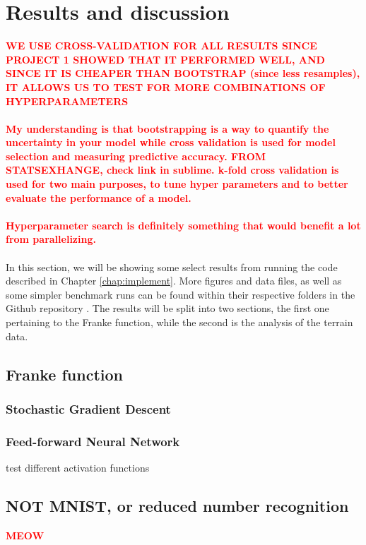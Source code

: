 \documentclass[a4paper]{article}
\newcommand\red[1]{\textcolor{red}{\textbf{#1}}}
\begin{document}
\section{Results and discussion} \label{chap:results}
\red{WE USE CROSS-VALIDATION FOR ALL RESULTS SINCE PROJECT 1 SHOWED THAT IT PERFORMED WELL, AND SINCE IT IS CHEAPER THAN BOOTSTRAP (since less resamples), IT ALLOWS US TO TEST FOR MORE COMBINATIONS OF HYPERPARAMETERS} 
\\\\
\red{My understanding is that bootstrapping is a way to quantify the uncertainty in your model while cross validation is used for model selection and measuring predictive accuracy. FROM STATSEXHANGE, check link in sublime. k-fold cross validation is used for two main purposes, to tune hyper parameters and to better evaluate the performance of a model.}
\\\\
\red{Hyperparameter search is definitely something that would benefit a lot from parallelizing.}
\\\\
In this section, we will be showing some select results from running the code described in Chapter \ref{chap:implement}. More figures and data files, as well as some simpler benchmark runs can be found within their respective folders in the Github repository \cite{Github1}. The results will be split into two sections, the first one pertaining to the Franke function, while the second is the analysis of the terrain data.

\subsection{Franke function}

\subsubsection{Stochastic Gradient Descent}

\subsubsection{Feed-forward Neural Network}
test different activation functions

\subsection{NOT MNIST, or reduced number recognition}
\red{MEOW}
\end{document}
